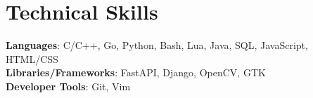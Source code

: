 \documentclass[letterpaper,11pt]{article}
\newcommand{\resumeSubHeadingListEnd}{\end{itemize}}
\begin{document}
%

\section{Technical Skills}
 \begin{itemize}[leftmargin=0.15in, label={}]
    \small{\item{
     \textbf{Languages}{: C/C++, Go, Python, Bash, Lua, Java, SQL, JavaScript, HTML/CSS} \\
     \textbf{Libraries/Frameworks}{: FastAPI, Django, OpenCV, GTK} \\
     \textbf{Developer Tools}{: Git, Vim} \\
    }}
 \end{itemize}



\end{document}
